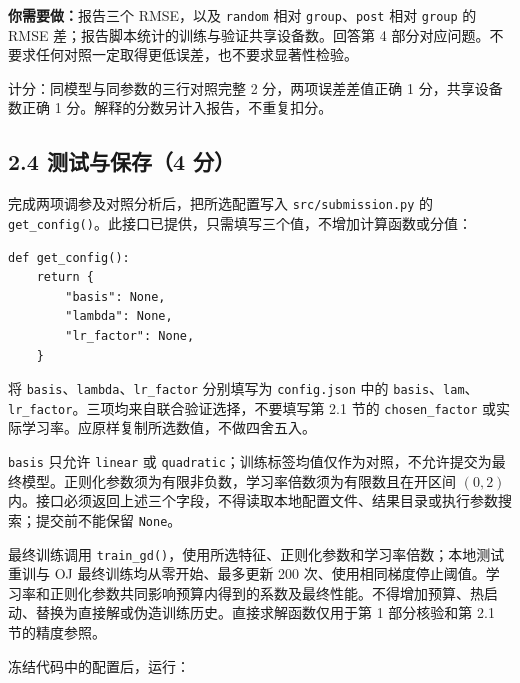 \documentclass[11pt,a4paper]{article}
\newcommand{\code}[1]{{\small\nolinkurl{#1}}}
\begin{document}
\textbf{你需要做：}报告三个 RMSE，以及 \code{random} 相对 \code{group}、\code{post} 相对 \code{group} 的 RMSE 差；报告脚本统计的训练与验证共享设备数。回答第 4 部分对应问题。不要求任何对照一定取得更低误差，也不要求显著性检验。

计分：同模型与同参数的三行对照完整 2 分，两项误差差值正确 1 分，共享设备数正确 1 分。解释的分数另计入报告，不重复扣分。


\subsection*{2.4 测试与保存（4 分）}
完成两项调参及对照分析后，把所选配置写入 \code{src/submission.py} 的 \code{get_config()}。此接口已提供，只需填写三个值，不增加计算函数或分值：


\par{}\noindent\begin{minipage}{\linewidth}
\begin{lstlisting}[aboveskip=0pt,belowskip=0pt]
def get_config():
    return {
        "basis": None,
        "lambda": None,
        "lr_factor": None,
    }
\end{lstlisting}
\end{minipage}\par{}
将 \code{basis}、\code{lambda}、\code{lr_factor} 分别填写为 \code{config.json} 中的 \code{basis}、\code{lam}、\code{lr_factor}。三项均来自联合验证选择，不要填写第 2.1 节的 \code{chosen_factor} 或实际学习率。应原样复制所选数值，不做四舍五入。

\code{basis} 只允许 \code{linear} 或 \code{quadratic}；训练标签均值仅作为对照，不允许提交为最终模型。正则化参数须为有限非负数，学习率倍数须为有限数且在开区间 $(0,2)$ 内。接口必须返回上述三个字段，不得读取本地配置文件、结果目录或执行参数搜索；提交前不能保留 \code{None}。

最终训练调用 \code{train_gd()}，使用所选特征、正则化参数和学习率倍数；本地测试重训与 OJ 最终训练均从零开始、最多更新 200 次、使用相同梯度停止阈值。学习率和正则化参数共同影响预算内得到的系数及最终性能。不得增加预算、热启动、替换为直接解或伪造训练历史。直接求解函数仅用于第 1 部分核验和第 2.1 节的精度参照。

冻结代码中的配置后，运行：
\end{document}

